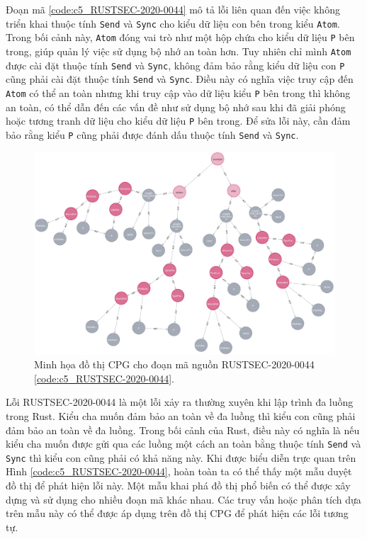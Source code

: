 Đoạn mã \ref{code:c5_RUSTSEC-2020-0044} mô tả lỗi liên quan đến việc không triển khai thuộc tính \texttt{Send} và \texttt{Sync} cho kiểu dữ liệu con bên trong kiểu \texttt{Atom}.
Trong bối cảnh này, \texttt{Atom} đóng vai trò như một hộp chứa cho kiểu dữ liệu \texttt{P} bên trong, giúp quản lý việc sử dụng bộ nhớ an toàn hơn.
Tuy nhiên chỉ mình \texttt{Atom} được cài đặt thuộc tính \texttt{Send} và \texttt{Sync}, không đảm bảo rằng kiểu dữ liệu con \texttt{P} cũng phải cài đặt thuộc tính \texttt{Send} và \texttt{Sync}.
Điều này có nghĩa việc truy cập đến \texttt{Atom} có thể an toàn nhưng khi truy cập vào dữ liệu kiểu \texttt{P} bên trong thì không an toàn, có thể dẫn đến các vấn đề như sử dụng bộ nhớ sau khi đã giải phóng hoặc tương tranh dữ liệu cho kiểu dữ liệu \texttt{P} bên trong.
Để sửa lỗi này, cần đảm bảo rằng kiểu \texttt{P} cũng phải được đánh dấu thuộc tính \texttt{Send} và \texttt{Sync}.

\begin{figure}[H]
    \includegraphics[width=1\columnwidth]{figures/c5/c5_RUSTSEC-2020-0044.png}
    \centering
    \caption{Minh họa đồ thị CPG cho đoạn mã nguồn RUSTSEC-2020-0044 \ref{code:c5_RUSTSEC-2020-0044}.}
    \label{img:c5_RUSTSEC-2020-0044}
\end{figure}

Lỗi RUSTSEC-2020-0044 là một lỗi xảy ra thường xuyên khi lập trình đa luồng trong Rust.
Kiểu cha muốn đảm bảo an toàn về đa luồng thì kiểu con cũng phải đảm bảo an toàn về đa luồng.
Trong bối cảnh của Rust, điều này có nghĩa là nếu kiểu cha muốn được gửi qua các luồng một cách an toàn bằng thuộc tính \texttt{Send} và \texttt{Sync} thì kiểu con cũng phải có khả năng này.
Khi được biểu diễn trực quan trên Hình \ref{code:c5_RUSTSEC-2020-0044}, hoàn toàn ta có thể thấy một mẫu duyệt đồ thị để phát hiện lỗi này.
Một mẫu khai phá đồ thị phổ biến có thể được xây dựng và sử dụng cho nhiều đoạn mã khác nhau.
Các truy vấn hoặc phân tích dựa trên mẫu này có thể được áp dụng trên đồ thị CPG để phát hiện các lỗi tương tự.

